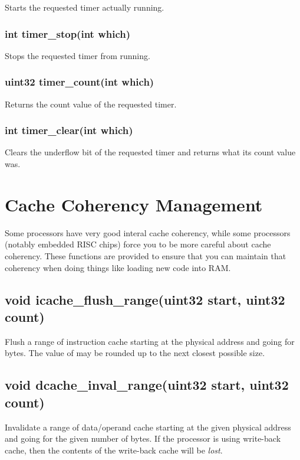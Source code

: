 \documentclass[english]{report}
\begin{document}
Starts the requested timer actually running.

\subsubsection{int timer\_stop(int which)}

Stops the requested timer from running.

\subsubsection{uint32 timer\_count(int which)}

Returns the count value of the requested timer.

\subsubsection{int timer\_clear(int which)}

Clears the underflow bit of the requested timer and returns what
its count value was.



\section{Cache Coherency Management}

Some processors have very good interal cache coherency, while some
processors (notably embedded RISC chips) force you to be more careful
about cache coherency. These functions are provided to ensure that
you can maintain that coherency when doing things like loading new
code into RAM.

\subsection{void icache\_flush\_range(uint32 start, uint32 count)}

Flush a range of instruction cache starting at the physical address
 and going for  bytes. The value
of  may be rounded up to the next closest possible
size.

\subsection{void dcache\_inval\_range(uint32 start, uint32 count)}

Invalidate a range of data/operand cache starting at the given
physical address and going for the given number of bytes. If the
processor is using write-back cache, then the contents of the
write-back cache will be \emph{lost}.
\end{document}
